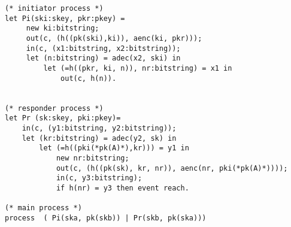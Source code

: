 \documentclass[10pt,a4paper]{article}
\begin{document}
\begin{Verbatim}[fontsize=\scriptsize]
(* initiator process *)
let Pi(ski:skey, pkr:pkey) = 
	 new ki:bitstring; 
	 out(c, (h((pk(ski),ki)), aenc(ki, pkr)));
	 in(c, (x1:bitstring, x2:bitstring));
	 let (n:bitstring) = adec(x2, ski) in
		 let (=h((pkr, ki, n)), nr:bitstring) = x1 in
			 out(c, h(n)).
	 

(* responder process *)
let Pr (sk:skey, pki:pkey)=
	in(c, (y1:bitstring, y2:bitstring));
	let (kr:bitstring) = adec(y2, sk) in
		let (=h((pki(*pk(A)*),kr))) = y1 in
			new nr:bitstring; 
			out(c, (h((pk(sk), kr, nr)), aenc(nr, pki(*pk(A)*))));
			in(c, y3:bitstring);
			if h(nr) = y3 then event reach.
			
(* main process *)
process  ( Pi(ska, pk(skb)) | Pr(skb, pk(ska)))
\end{Verbatim}
\end{document}
